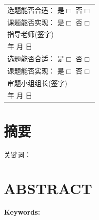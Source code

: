 {\newpage
\begin{table}[h]
    \centering
    \begin{tabularx}{\textwidth}{|X|}
     \hline
     \qquad \vspace*{430pt} \\ \hline
     {选题能否合适： 是{\large{$\Box$}} \qquad 否{\large{$\Box$}}} \\
     {课题能否实现： 是{\large{$\Box$}} \qquad 否{\large{$\Box$}}} \\
     {\hfill 指导老师(签字) \hspace*{9em}} \\
     {\hfill 年 \qquad 月 \qquad 日 \hspace*{3em}}  \\ \hline
     {选题能否合适： 是{\large{$\Box$}} \qquad 否{\large{$\Box$}}} \\
     {课题能否实现： 是{\large{$\Box$}} \qquad 否{\large{$\Box$}}} \\
     {\hfill 审题小组组长(签字) \hspace*{9em}} \\
     {\hfill 年 \qquad 月 \qquad 日 \hspace*{3em}} \\ \hline
     \end{tabularx}
\end{table}
\thispagestyle{empty}

\clearpage
{}
\chapter*{\centering\sanhao\bf{摘\qquad 要}}
\song{}
\@cabstract
\vspace{\baselineskip}

\hangindent=52.3pt\noindent
{\hei\xiaosi 关键词：} \@ckeywords
\thispagestyle{empty}

\clearpage
{}
\chapter*{\centering\sanhao\bf{ABSTRACT}}
\@eabstract
\vspace{\baselineskip}

\hangindent=60pt\noindent
{\textbf{Keywords:}} \@ekeywords
\thispagestyle{empty}
}
\makeatother
